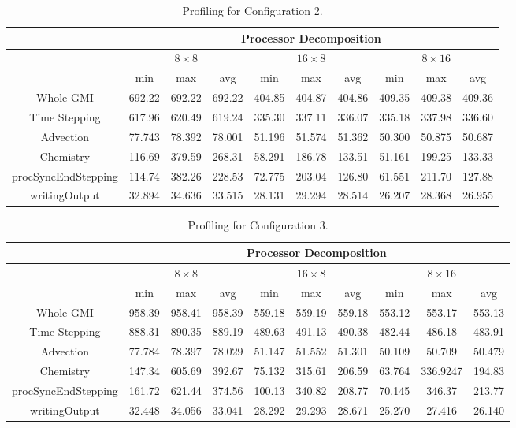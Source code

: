 \begin{table}[!h]
\begin{center}
\begin{tabular}{||c||c|c|c||c|c|c||c|c|c||} \hline\hline
 & \multicolumn{9}{|c|}{\bf Processor Decomposition} \\ \hline
 & \multicolumn{3}{|c|}{$8 \times 8$} & \multicolumn{3}{|c|}{$16 \times 8$} & \multicolumn{3}{|c|}{$8 \times 16$} \\ \hline & min & max & avg & min & max & avg & min & max & avg \\ \hline\hline
Whole GMI           &692.22&692.22&692.22&404.85&404.87&404.86&409.35&409.38&409.36\\
Time Stepping       &617.96&620.49&619.24&335.30&337.11&336.07&335.18&337.98&336.60\\
Advection           &77.743&78.392&78.001&51.196&51.574&51.362&50.300&50.875&50.687\\
Chemistry           &116.69&379.59&268.31&58.291&186.78&133.51&51.161&199.25&133.33\\
procSyncEndStepping &114.74&382.26&228.53&72.775&203.04&126.80&61.551&211.70&127.88 \\
writingOutput       &32.894&34.636&33.515&28.131&29.294&28.514&26.207&28.368&26.955\\ \hline\hline
\end{tabular}   
\caption{Profiling for Configuration 2.}
\label{tab:wretime2}
\end{center}
\end{table}


\begin{table}[!h]
\begin{center}
\begin{tabular}{||c||c|c|c||c|c|c||c|c|c||} \hline\hline
 & \multicolumn{9}{|c|}{\bf Processor Decomposition} \\ \hline
 & \multicolumn{3}{|c|}{$8 \times 8$} & \multicolumn{3}{|c|}{$16 \times 8$} & \multicolumn{3}{|c|}{$8 \times 16$} \\ \hline
 & min & max & avg & min & max & avg & min & max & avg \\ \hline\hline
Whole GMI           &958.39&958.41&958.39&559.18&559.19&559.18&553.12&553.17&553.13\\
Time Stepping       &888.31&890.35&889.19&489.63&491.13&490.38&482.44&486.18&483.91\\
Advection           &77.784&78.397&78.029&51.147&51.552&51.301&50.109&50.709&50.479\\
Chemistry           &147.34&605.69&392.67&75.132&315.61&206.59&63.764&336.9247&194.83\\
procSyncEndStepping &161.72&621.44&374.56&100.13&340.82&208.77&70.145&346.37&213.77\\
writingOutput       &32.448&34.056&33.041&28.292&29.293&28.671&25.270&27.416&26.140\\ \hline\hline
\end{tabular}
\caption{Profiling for Configuration 3.}
\label{tab:wretime3}
\end{center}
\end{table}

